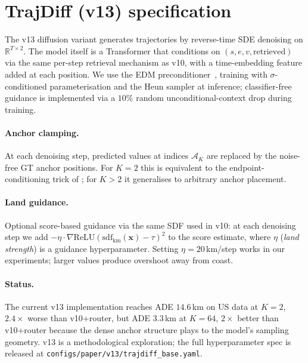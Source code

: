 \documentclass[11pt]{article}
\begin{document}
\section{TrajDiff (v13) specification}
\label{sec:v13-details}

The v13 diffusion variant generates trajectories by reverse-time SDE
denoising on $\mathbb{R}^{T \times 2}$. The model itself is a
Transformer that conditions on $(s, e, v, \text{retrieved})$ via the
same per-step retrieval mechanism as v10, with a time-embedding feature
added at each position. We use the EDM
preconditioner~\citep{edm2022}, training with $\sigma$-conditioned
parameterisation and the Heun sampler at inference; classifier-free
guidance is implemented via a $10$\% random unconditional-context drop
during training.

\paragraph{Anchor clamping.} At each denoising step, predicted values
at indices $\mathcal{A}_K$ are replaced by the noise-free GT anchor
positions. For $K=2$ this is equivalent to the endpoint-conditioning
trick of \citet{motiondiffuser2023}; for $K>2$ it generalises to
arbitrary anchor placement.

\paragraph{Land guidance.} Optional score-based guidance via the same
SDF used in v10: at each denoising step we add
$-\eta \cdot \nabla \mathrm{ReLU}(\mathrm{sdf}_{\text{km}}(\mathbf{x}) - \tau)^2$
to the score estimate, where $\eta$ (\textit{land strength}) is a
guidance hyperparameter. Setting $\eta = 20$\,km/step works in our
experiments; larger values produce overshoot away from coast.

\paragraph{Status.} The current v13 implementation reaches
ADE $14.6$\,km on US data at $K{=}2$, $2.4\times$ worse than v10+router,
but ADE $3.3$\,km at $K{=}64$, $2\times$ better than v10+router because
the dense anchor structure plays to the model's sampling geometry.
v13 is a methodological exploration; the full hyperparameter spec is
released at \texttt{configs/paper/v13/trajdiff\_base.yaml}.

\end{document}

